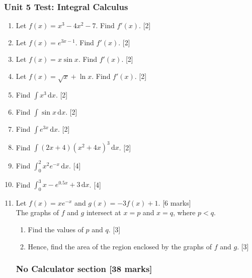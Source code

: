 \documentclass[12pt, twoside]{article}
\begin{document}
\subsubsection*{Unit 5 Test: Integral Calculus}
 \begin{enumerate}

\subsubsection*{You may use a calculator on these problems \hfill [30 marks]}


  \item Let $f(x)=x^3-4x^2-7$. Find $f'(x)$. \hfill [2]
  \item Let $f(x)=e^{3x-1}$. Find $f'(x)$. \hfill [2]
  \item Let $f(x)=x \sin x$. Find $f'(x)$. \hfill [2]
  \item Let $f(x)=\sqrt{x} + \ln x$. Find $f'(x)$. \hfill [2]

  \item Find $\int x^3 \,\mathrm{d}x$. \hfill [2]
  \item Find $\int \sin x \,\mathrm{d}x$. \hfill [2]
  \item Find $\int e^{3x} \,\mathrm{d}x$. \hfill [2]
  \item Find $\int (2x+4)(x^2+4x)^3 \,\mathrm{d}x$. \hfill [2]

  \item Find $\int_0^2 x^2 e^{-x} \,\mathrm{d}x$. \hfill [4]
  \item Find $\int_0^3 x - e^{0.5x}+3 \,\mathrm{d}x$. \hfill [4] \vspace{1.0cm}


   \item Let $f(x)=xe^{-x}$ and $g(x)=-3f(x)+1$. \hfill [6 marks]\\
   The graphs of $f$ and $g$ intersect at $x=p$ and $x=q$, where $p<q$.
   \begin{enumerate}
     \item Find the values of $p$ and $q$. \hfill [3] \vspace{1.5cm}
     \item Hence, find the area of the region enclosed by the graphs of $f$ and $g$. \hfill [3]
   \end{enumerate}

\newpage
\subsubsection*{No Calculator section \hfill [38 marks]}


\end{enumerate}
\end{document}
